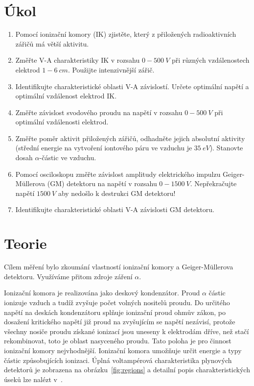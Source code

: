 \documentclass{protokol}
\begin{document}
    \section*{Úkol}

    \begin{enumerate}
        \item Pomocí ionizační komory (IK) zjistěte, který z přiložených radioaktivních zářičů má větší aktivitu.

        \item Změřte V-A charakteristiky IK v rozsahu $0-\SI{500}{V}$ při různých vzdálenostech elektrod $1-\SI{6}{cm}$.
        Použijte intenzivnější zářič.

        \item Identifikujte charakteristické oblasti V-A závislostí.
        Určete optimální napětí a optimální vzdálenost elektrod IK.

        \item Změřte závislost svodového proudu na napětí v rozsahu $0-\SI{500}{V}$ při optimální vzdálenos\-ti elektrod.

        \item Změřte poměr aktivit přiložených zářičů, odhadněte jejich absolutní aktivity (střední energie na vytvoření iontového páru ve vzduchu je $\SI{35}{eV}$).
        Stanovte dosah $\alpha$-částic ve vzduchu.

        \item Pomocí osciloskopu změřte závislost amplitudy elektrického impulzu Geiger-Müllerova (GM) detektoru na napětí v rozsahu $0-\SI{1500}{V}$.
        Nepřekračujte napětí $\SI{1500}{V}$ aby nedošlo k destrukci GM detektoru!
        \item Identifikujte charakteristické oblasti V-A závislosti GM detektoru.

    \end{enumerate}

    \section*{Teorie}

    Cílem měření bylo zkoumání vlastností ionizační komory a Geiger-Müllerova detektoru.
    Využí\-váme přitom zdroje záření $\alpha$.

    Ionizační komora je realizována jako deskový kondenzátor.
    Proud $\alpha$ částic ionizuje vzduch a tudíž zvyšuje počet volných nositelů proudu.
    Do určitého napětí na deskách kondenzátoru splňuje ionizační proud ohmův zákon, po dosažení kritického napětí již proud na zvyšujícím se napětí nezávisí, protože všechny nosiče proudu získané ionizací jsou uneseny k elektrodám dříve, než stačí rekombinovat, toto je oblast nasyceného proudu.
    Tato poloha je pro činnost ionizační komory nejvhodnější.
    Ionizační komora umožňuje určit energie a typy částic způsobujících ionizaci.
    Úplná voltampérová charakteristika plynových detektorů je zobrazena na obrázku~\ref{fig:regions} a detailní popis charakteristických úseků lze nalézt v~\cite{pokyny}.
\end{document}
